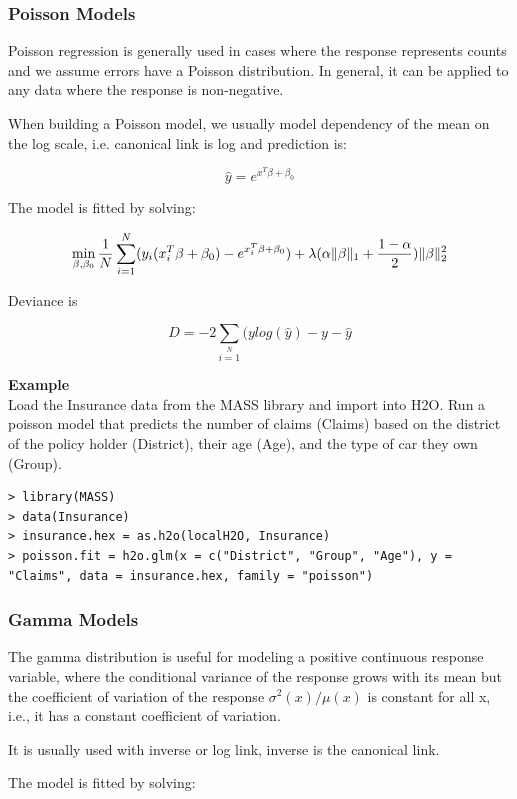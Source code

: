 \documentclass{article}[11pt]
\begin{document}
\subsubsection{Poisson Models}
Poisson regression is generally used in cases where the response represents counts and we assume errors have a Poisson distribution. In general, it can be applied to any data where the response is non-negative. 

When building a Poisson model, we usually model dependency of the mean on the log scale, i.e. canonical link is log and prediction is:

\[\hat{y} = e^{x^T\beta + \beta_0}\]

The model is fitted by solving:

\[  \min\limits_{\beta,\beta_0} { {1 \over N}\sum\limits_{i=1}\limits^{N}(y_i (x_i^{T}\beta  + \beta_0) - e^{x_i^{T}\beta  + \beta_0})  + \lambda (\alpha \|\beta \|_1 + {1-\alpha \over 2}) \| \beta \|_2^2} \]

Deviance is 

\[D = -2\sum\limits_{i=1}\limits^{N}{(y log(\hat{y}) - y - \hat{y}}\]


\textbf{Example}\\

Load the Insurance data from the MASS library and import into H2O. Run a poisson model that predicts the number of claims (Claims) based on the district of the policy holder (District), their age (Age), and the type of car they own (Group).
\begin{lstlisting}[breaklines,basicstyle=\ttfamily]
> library(MASS)
> data(Insurance)
> insurance.hex = as.h2o(localH2O, Insurance)
> poisson.fit = h2o.glm(x = c("District", "Group", "Age"), y = "Claims", data = insurance.hex, family = "poisson")
\end{lstlisting}

\subsubsection{Gamma Models}
The gamma distribution is useful for modeling a positive continuous response variable, where the conditional variance of the response grows with its mean but  the coefficient of variation of the response $\sigma^2(x)/μ(x)$ is constant for all x,  i.e., it has a constant coefficient of variation.

It is usually used with inverse or log link, inverse is the canonical link.

The model is fitted by solving:
\end{document}
